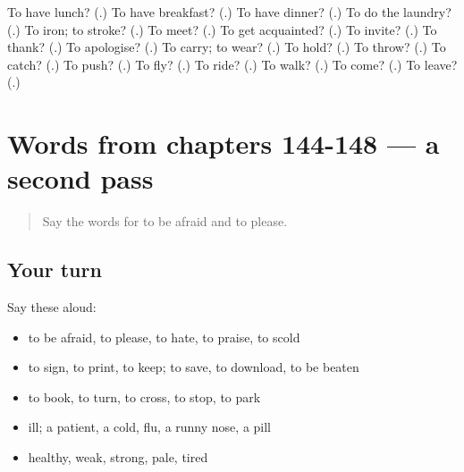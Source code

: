 \begin{tcolorbox}[breakable,colback=teal!4,colframe=teal!35!black,title={Before you move on}]
To have lunch? (\textbf{}.) To have breakfast? (\textbf{}.) To have dinner? (\textbf{}.) To do the laundry? (\textbf{}.) To iron; to stroke? (\textbf{}.) To meet? (\textbf{}.) To get acquainted? (\textbf{}.) To invite? (\textbf{}.) To thank? (\textbf{}.) To apologise? (\textbf{}.) To carry; to wear? (\textbf{}.) To hold? (\textbf{}.) To throw? (\textbf{}.) To catch? (\textbf{}.) To push? (\textbf{}.) To fly? (\textbf{}.) To ride? (\textbf{}.) To walk? (\textbf{}.) To come? (\textbf{}.) To leave? (\textbf{}.)
\end{tcolorbox}
\section[(dialogue)]{Words from chapters 144-148 — a second pass}

\label{lesson:RU-R148-second-pass-words-from-chapters-144-148}



\begin{quote}
Say the words for to be afraid and to please.
\end{quote}

\subsection*{Your turn}
Say these aloud:

\begin{itemize}
\raggedright
  \item to be afraid, to please, to hate, to praise, to scold
  \item to sign, to print, to keep; to save, to download, to be beaten
  \item to book, to turn, to cross, to stop, to park
  \item ill; a patient, a cold, flu, a runny nose, a pill
  \item healthy, weak, strong, pale, tired
\end{itemize}

